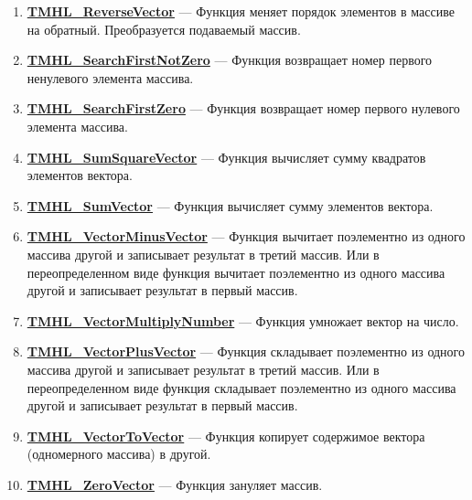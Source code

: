 \documentclass[a4paper,12pt]{article}
\begin{document}
\begin{enumerate}
\item \textbf{\hyperref[TMHL_ReverseVector]{TMHL\_ReverseVector}} --- Функция меняет порядок элементов в массиве на обратный. Преобразуется подаваемый массив.

\item \textbf{\hyperref[TMHL_SearchFirstNotZero]{TMHL\_SearchFirstNotZero}} --- Функция возвращает номер первого ненулевого элемента массива.

\item \textbf{\hyperref[TMHL_SearchFirstZero]{TMHL\_SearchFirstZero}} --- Функция возвращает номер первого нулевого элемента массива.

\item \textbf{\hyperref[TMHL_SumSquareVector]{TMHL\_SumSquareVector}} --- Функция вычисляет сумму квадратов элементов вектора.

\item \textbf{\hyperref[TMHL_SumVector]{TMHL\_SumVector}} --- Функция вычисляет сумму элементов вектора.

\item \textbf{\hyperref[TMHL_VectorMinusVector]{TMHL\_VectorMinusVector}} --- Функция вычитает поэлементно из одного массива другой и записывает результат в третий массив. Или в переопределенном виде функция вычитает поэлементно из одного массива другой и записывает результат в первый массив.

\item \textbf{\hyperref[TMHL_VectorMultiplyNumber]{TMHL\_VectorMultiplyNumber}} --- Функция умножает вектор на число.

\item \textbf{\hyperref[TMHL_VectorPlusVector]{TMHL\_VectorPlusVector}} --- Функция складывает поэлементно из одного массива другой и записывает результат в третий массив. Или в переопределенном виде функция складывает поэлементно из одного массива другой и записывает результат в первый массив.

\item \textbf{\hyperref[TMHL_VectorToVector]{TMHL\_VectorToVector}} --- Функция копирует содержимое вектора (одномерного массива) в другой.

\item \textbf{\hyperref[TMHL_ZeroVector]{TMHL\_ZeroVector}} --- Функция зануляет массив.

\end{enumerate}
\end{document}
